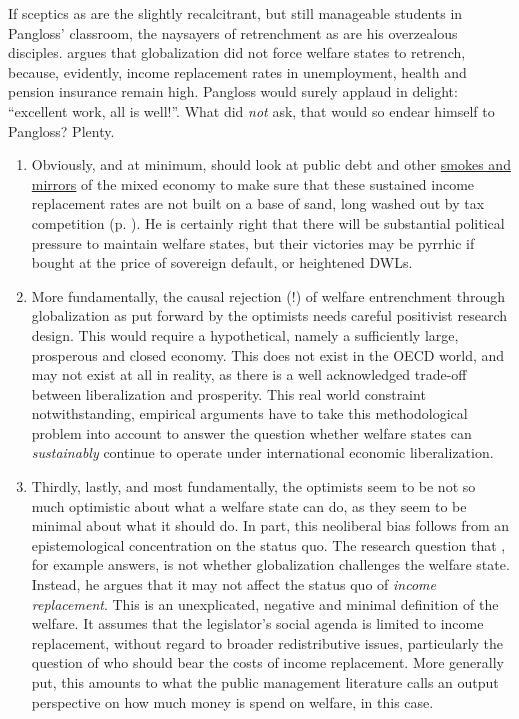 \documentclass[11pt,a4paper,oneside,openright]{article}
\begin{document}
If sceptics as \citeauthor{Beckfield2006} are the slightly recalcitrant, but still manageable students in Pangloss' classroom, the naysayers of retrenchment as \cite{Swank-2005-aa} are his overzealous disciples. 
\citeauthor{Swank-2005-aa} argues that globalization did not force welfare states to retrench, because, evidently, income replacement rates in unemployment, health and pension insurance remain high. 
Pangloss would surely applaud in delight: 
``excellent work, all is well!''. 
What did \citeauthor{Swank-2005-aa} \emph{not} ask, that would so endear himself to Pangloss? 
Plenty. 
\begin{enumerate}
	\item Obviously, and at minimum, \citeauthor{Swank-2005-aa} should look at public debt and other \hyperref[sec:smoke_n_mirrors]{smokes and mirrors} of the mixed economy to make sure that these sustained income replacement rates are not built on a base of sand, long washed out by tax competition (p. \pageref{sec:smoke_n_mirrors}). 
	He is certainly right that there will be substantial political pressure to maintain welfare states, but their victories may be pyrrhic if bought at the price of sovereign default, or heightened \glspl{DWL}.
	\item More fundamentally, the causal rejection (!) of welfare entrenchment through globalization as put forward by the optimists needs careful positivist research design. 
	 This would require a hypothetical, namely a sufficiently large, prosperous and closed economy. 
	 This does not exist in the OECD world, and may not exist at all in reality, as there is a well acknowledged trade-off between liberalization and prosperity. 
	 This real world constraint notwithstanding, empirical arguments have to take this methodological problem into account to answer the question whether welfare states can \emph{sustainably} continue to operate under international economic liberalization.
	\item Thirdly, lastly, and most fundamentally, the optimists seem to be not so much optimistic about what a welfare state can do, as they seem to be minimal about what it should do. 
	In part, this neoliberal bias follows from an epistemological concentration on the status quo. 
	The research question that \citeauthor{Swank-2005-aa}, for example answers, is not whether globalization challenges the welfare state. 
	Instead, he argues that it may not affect the status quo of \emph{income replacement}. 
	This is an unexplicated, negative and minimal definition of the welfare. 
	It assumes that the legislator’s social agenda is limited to income replacement, without regard to broader redistributive issues, particularly the question of who should bear the costs of income replacement. 
	More generally put, this amounts to what the public management literature calls an output perspective on how much money is spend on welfare, in this case.
\end{enumerate}
 
\end{document}
